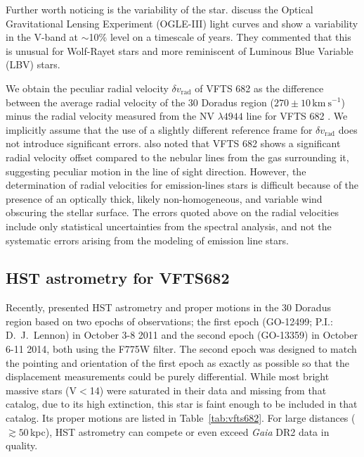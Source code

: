 \documentclass[apjl,twocolumn]{emulateapj}
\newcommand{\kms}{{\,\mathrm{km\ s^{-1}}}}
\DeclareRobustCommand{\Tabref}[1]{Table~\ref{#1}}
\begin{document}
Further worth noticing is the variability of the
star. %
\citet{bestenlehner:11} discuss the Optical Gravitational Lensing
Experiment (OGLE-III) light curves \citep{udalski:08} and show a
variability in the V-band at $\sim$10\% level on a timescale of years.
They commented that this is unusual for Wolf-Rayet stars and more reminiscent
of Luminous Blue Variable (LBV) stars. %

We obtain the peculiar radial velocity $\delta v_\mathrm{rad}$ of VFTS 682 as the difference
between the average radial velocity of the 30 Doradus region
($270\pm10\kms$) minus the radial velocity measured from the NV $\lambda4944$
line for VFTS 682  \citep[$300\pm10\kms$, ][]{bestenlehner:11}. We implicitly assume that the use
of a slightly different reference frame for $\delta v_\mathrm{rad}$ does not
introduce significant errors. \cite{bressert:12} also noted that VFTS
682 shows a significant radial velocity offset compared to the nebular
lines from the gas surrounding it, suggesting peculiar motion in the
line of sight direction. However, the determination of
radial velocities for emission-lines stars is difficult because of the
presence of an optically thick, likely non-homogeneous, and variable
wind obscuring the stellar surface. The errors quoted above on the
radial velocities include only statistical uncertainties from the
spectral analysis, and not the systematic errors arising from the
modeling of emission line stars.


\subsection{HST astrometry for VFTS682}
Recently, \citet{platais:18} presented HST  astrometry and proper
motions in the 30 Doradus region based on two epochs of
observations; the first epoch (GO-12499; P.I.: D.~J.~Lennon)
in October 3-8 2011 and the second epoch (GO-13359) in
October 6-11 2014, both using the F775W filter.
The second epoch was designed to match the pointing and
orientation of the first epoch as exactly as possible so
that the displacement measurements could be purely differential.
While most bright massive stars (V$<$14) were saturated in
their data and missing from that catalog, due to its
high extinction, this star is faint enough
to be included in that catalog. Its proper motions are
listed in \Tabref{tab:vfts682}. For
large distances ($\gtrsim50$\,kpc), HST astrometry can compete or even
exceed \emph{Gaia} DR2 data in quality.
\end{document}
